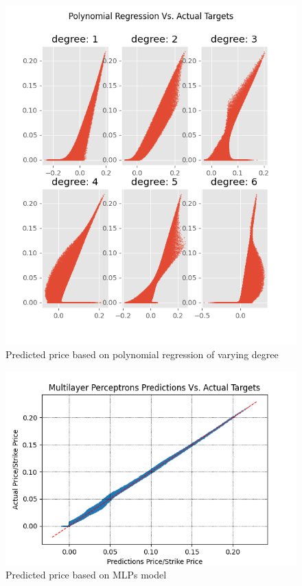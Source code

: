 \begin{figure}[th]
\centering
\includegraphics{Figures/polynomialOutMoneyEuroC.png}
\decoRule
\caption[Polynomial Regression Predictions Vs. Actual Prices]{Predicted price based on polynomial regression of varying degree}
\label{fig:PolynomialOutMoneyEuroC}
\end{figure}

\begin{figure}[th]
\centering
\includegraphics{Figures/PredictionOutMoneyEuroC.png}
\decoRule
\caption[MLPs Predictions Vs. Actual Prices]{Predicted price based on MLPs model}
\label{fig:MLPsOutMoneyEuroC}
\end{figure}

